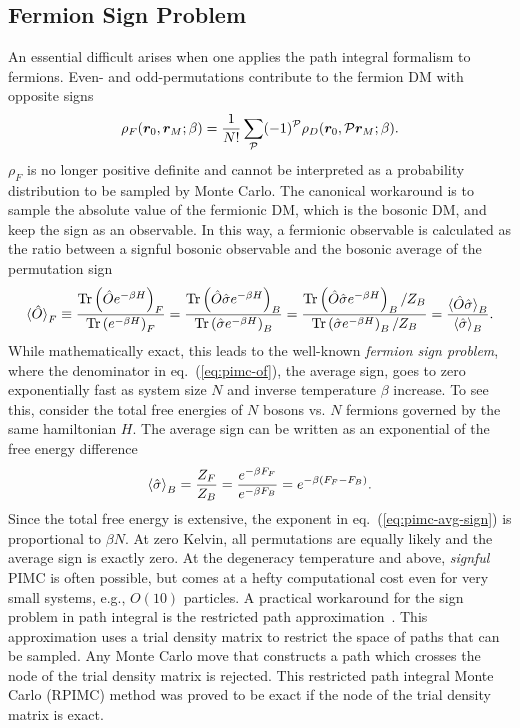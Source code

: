 \subsection{Fermion Sign Problem} \label{sec:fermion-sign-problem}
An essential difficult arises when one applies the path integral formalism to fermions. Even- and odd-permutations contribute to the fermion DM with opposite signs
\begin{align}
\rho_F(\boldsymbol{r}_0,\boldsymbol{r}_M;\beta) = \frac{1}{N!}\sum\limits_{\mathcal{P}} (-1)^{\mathcal{P}} \rho_D(\boldsymbol{r}_0, \mathcal{P}\boldsymbol{r}_M;\beta).
\end{align}
$\rho_F$ is no longer positive definite and cannot be interpreted as a probability distribution to be sampled by Monte Carlo. The canonical workaround is to sample the absolute value of the fermionic DM, which is the bosonic DM, and keep the sign as an observable. In this way, a fermionic observable is calculated as the ratio between a signful bosonic observable and the bosonic average of the permutation sign
\begin{align} \label{eq:pimc-of}
\braket{\hat{O}}_F \equiv \dfrac{\text{Tr}\left(\hat{O}e^{-\beta H}\right)_F}{\text{Tr}\left(e^{-\beta H}\right)_F}=
\dfrac{\text{Tr}\left(\hat{O}\hat{\sigma}e^{-\beta H}\right)_B}{\text{Tr}\left(\hat{\sigma} e^{-\beta H}\right)_B}=
\dfrac{\text{Tr}\left(\hat{O}\hat{\sigma}e^{-\beta H}\right)_B/Z_B}{\text{Tr}\left(\hat{\sigma} e^{-\beta H}\right)_B/Z_B}=\dfrac{\braket{\hat{O}\hat{\sigma}}_B}{ \braket{\hat{\sigma}}_B }.
\end{align}
While mathematically exact, this leads to the well-known \emph{fermion sign problem}, where the denominator in eq.~(\ref{eq:pimc-of}), the average sign, goes to zero exponentially fast as system size $N$ and inverse temperature $\beta$ increase.
To see this, consider the total free energies of $N$ bosons vs. $N$ fermions governed by the same hamiltonian $H$. The average sign can be written as an exponential of the free energy difference
\begin{align} \label{eq:pimc-avg-sign}
\braket{\hat{\sigma}}_B = \dfrac{Z_F}{Z_B} = \dfrac{e^{-\beta F_F}}{e^{-\beta F_B}} = e^{-\beta (F_F-F_B)}.
\end{align}
Since the total free energy is extensive, the exponent in eq.~(\ref{eq:pimc-avg-sign}) is proportional to $\beta N$.
At zero Kelvin, all permutations are equally likely and the average sign is exactly zero.
At the degeneracy temperature and above, \textit{signful} PIMC is often possible, but comes at a hefty computational cost even for very small systems, e.g., $O(10)$ particles.
A practical workaround for the sign problem in path integral is the restricted path approximation~\cite{Ceperley1991,Ceperley1992,Ceperley1996}.
This approximation uses a trial density matrix to restrict the space of paths that can be sampled.
Any Monte Carlo move that constructs a path which crosses the node of the trial density matrix is rejected.
This restricted path integral Monte Carlo (RPIMC) method was proved to be exact if the node of the trial density matrix is exact.

